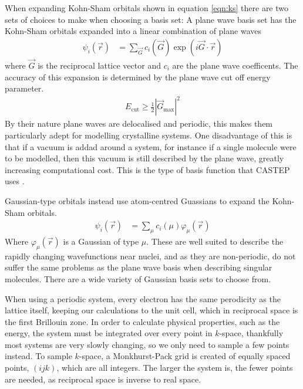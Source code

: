 \documentclass[10pt,a4paper,twocolumn,twoside]{extarticle}
\begin{document}
When expanding Kohn-Sham orbitals shown in equation \ref{eqn:ks} there are two sets of choices to make when choosing a basis set:  A plane wave basis set has the Kohn-Sham orbitals expanded into a linear combination of plane waves 
\begin{align*}
		\psi_i(\vec{r}) &= \sum_{\vec{G}} c_i(\vec{G}) \exp(i\vec{G}\cdot\vec{r})
\end{align*}
where $\vec{G}$ is the reciprocal lattice vector and $c_i$ are the plane wave coefficents. The accuracy of this expansion is determined by the plane wave cut off energy parameter.
\begin{align*}
	E_\text{cut} \geq \frac{1}{2}|{\vec{G}_\text{max}}|^2
\end{align*}
By their nature plane waves are delocalised and periodic, this makes them particularly adept for modelling crystalline systems. One disadvantage of this is that if a vacuum is addad around a system, for instance if a single molecule were to be modelled, then this vacuum is still described by the plane wave, greatly increasing computational cost. This is the type of basis function that CASTEP uses \cite{CASTEP}.

Gaussian-type orbitals instead use atom-centred Guassians to expand the Kohn-Sham orbitals. 
\begin{align*}
	\psi_i(\vec{r}) &= \sum_{\mu} c_i(\mu) \varphi_\mu(\vec{r})
\end{align*}
Where $\varphi_\mu(\vec{r})$ is a Gaussian of type $\mu$. These are well suited to describe the rapidly changing wavefunctions near nuclei, and as they are non-periodic, do not suffer the same problems as the plane wave basis when describing singular molecules. There are a wide variety of Gaussian basis sets to choose from.

When using a periodic system, every electron has the same perodicity as the lattice itself, keeping our calculations to the unit cell, which in reciprocal space is the first Brillouin zone. In order to calculate physical properties, such as the energy, the system must be integrated over every point in $k$-space, thankfully most systems are very slowly changing, so we only need to sample a few points instead. To sample $k$-space, a Monkhurst-Pack grid is created of equally spaced points, $(ijk)$, which are all integers. The larger the system is, the fewer points are needed, as reciprocal space is inverse to real space.
\end{document}
